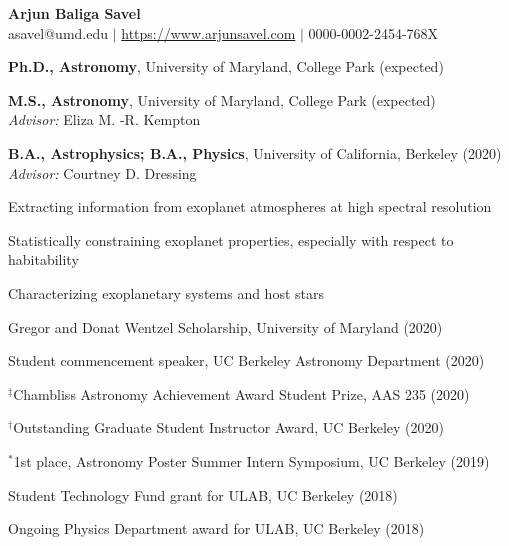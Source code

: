 \documentclass[12pt,letterpaper]{article}
\begin{document}
\thispagestyle{empty}\sloppy\sloppypar\raggedbottom
\centering
\textbf{\Large Arjun Baliga Savel} \hfill \\
\textsf{\small asavel@umd.edu $|$ \href{https://www.arjunsavel.com}{https://www.arjunsavel.com} $|$ 0000-0002-2454-768X}\\
\raggedright

\begin{list}{}{\cvlist}
\item
\textbf{Ph.D., Astronomy}, University of Maryland, College Park (expected)
\item
\textbf{M.S., Astronomy}, University of Maryland, College Park (expected)
\\\textit{Advisor:} Eliza M. -R. Kempton
\item
\textbf{B.A., Astrophysics; B.A., Physics}, University of California, Berkeley (2020) \\\textit{Advisor:} Courtney D. Dressing
\end{list}

\begin{list}{}{\cvlist}

\item Extracting information from exoplanet atmospheres at high spectral resolution
\item Statistically constraining exoplanet properties, especially with respect to habitability
\item Characterizing exoplanetary systems and host stars

\end{list}

  

  \begin{list}{}{\cvlist}
    
  \end{list}

  \begin{list}{}{\cvlist}
    
  \end{list}


\begin{list}{}{\cvlist}

\item Gregor and Donat Wentzel Scholarship, University of Maryland (2020)
\item Student commencement speaker, UC Berkeley Astronomy Department (2020)
\item $^\ddagger$Chambliss Astronomy Achievement Award Student Prize, AAS 235 (2020)
\item $^\dagger$Outstanding Graduate Student Instructor Award, UC Berkeley (2020)
\item $^*$1st place, Astronomy Poster Summer Intern Symposium, UC Berkeley (2019)
\item Student Technology Fund grant for ULAB, UC Berkeley (2018)
\item Ongoing Physics Department award for ULAB, UC Berkeley (2018)

\end{list}
\end{document}
